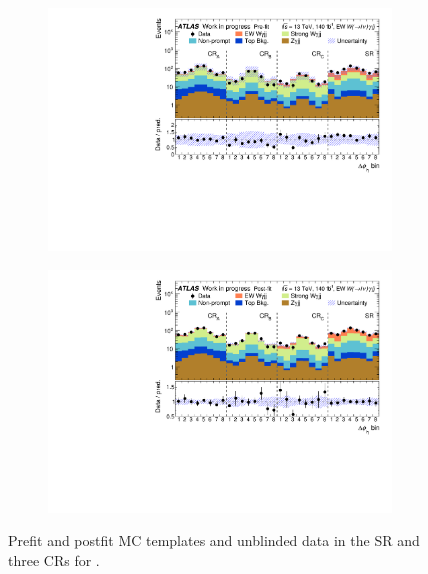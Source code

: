 
\begin{figure}[H]
\centering
\begin{subfigure}[b]{\textwidth}
    \centering
    \includegraphics[width=\textwidth]{plots/diffx/stacks/preFit_stack_lepgam_dphi_WIP_12Feb.pdf}
    \caption{}
\end{subfigure}
\hfill
\begin{subfigure}[b]{\textwidth}
    \centering
    \includegraphics[width=\textwidth]{plots/diffx/stacks/postFit_stack_lepgam_dphi_WIP_12Feb.pdf}
    \caption{}
\end{subfigure}
\caption{Prefit and postfit MC templates and unblinded data in the SR and three CRs for \lepgamdphi.}
\label{fig:lepgamdphi_templates}
\end{figure}

